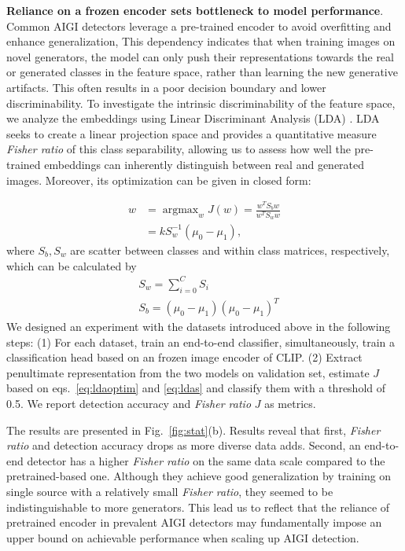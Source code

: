     \textbf{Reliance on a frozen encoder sets bottleneck to model performance}.
        Common AIGI detectors leverage a pre-trained encoder to avoid overfitting and enhance generalization, This dependency indicates that when training images on novel generators, the model can only push their representations towards the real or generated classes in the feature space, rather than learning the new generative artifacts. This often results in a poor decision boundary and lower discriminability. To investigate the intrinsic discriminability of the feature space, we analyze the embeddings using Linear Discriminant Analysis (LDA) \cite{fisher1936use}. LDA seeks to create a linear projection space and provides  a quantitative measure \textit{Fisher ratio} of this class separability, allowing us to assess how well the pre-trained embeddings can inherently distinguish between real and generated images. Moreover, its optimization can be given in closed form:
        
    \begin{equation}
        \begin{split}
          w & = \mathop{\arg\max}_{w}J (w)=\frac{w^TS_bw}{w^TS_ww} \\
            & =  kS_{w}^{-1}\left( \mu_0-\mu_1 \right),
        \end{split}
    \label{eq:ldaoptim}
    \end{equation}
    where $S_b, S_w$ are scatter between classes and within class matrices, respectively, which can be calculated by
    \begin{equation}
        \begin{split}        
            & S_w = \sum_{i=0}^{C}S_i \\ 
            & S_b = (\mu_0-\mu_1)(\mu_0-\mu_1)^T
        \end{split}
    \label{eq:ldas}
    \end{equation}
        We designed an experiment with the datasets introduced above in the following steps: (1) For each dataset, train an end-to-end classifier, simultaneously, train a classification head based on an frozen image encoder of CLIP. (2) Extract penultimate representation from the two models on validation set, estimate $J$ based on eqs.~\eqref{eq:ldaoptim} and \eqref{eq:ldas} and classify them with a threshold of 0.5. We report detection accuracy and \textit{Fisher ratio} $J$ as metrics.

        The results are presented in Fig.~\ref{fig:stat}(b). Results reveal that first,  \textit{Fisher ratio} and detection accuracy drops as more diverse data adds. Second, an end-to-end detector has a higher \textit{Fisher ratio} on the same data scale compared to the pretrained-based one. Although they achieve good generalization by training on single source with a relatively small \textit{Fisher ratio}, they seemed to be indistinguishable to more generators. This lead us to reflect that the reliance of pretrained encoder in prevalent AIGI detectors may fundamentally impose an upper bound on achievable performance when scaling up AIGI detection. 
        


